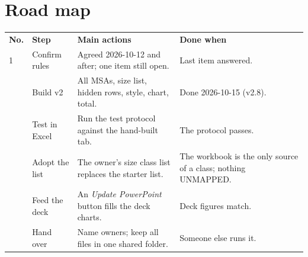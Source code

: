 \documentclass[11pt]{article}
\newcommand{\menu}[1]{\textit{#1}}
\begin{document}
\section{Road map}\label{sec:roadmap}
\begin{center}
\small
{}\label{tab:roadmap}
\renewcommand{\arraystretch}{1.0}
\begin{tabularx}{\linewidth}{|>{\centering\arraybackslash}m{0.25in}|>{\raggedright\arraybackslash}m{0.95in}|L|>{\raggedright\arraybackslash}m{1.45in}|}
  \hline
  \bfseries No. & \bfseries Step & \bfseries Main actions & \bfseries Done when \\
  \hhline{|=|=|=|=|}
  1 & Confirm rules & Agreed 2026-10-12 and after; one item still open. & Last item answered. \\
   & Build v2 & All MSAs, size list, hidden rows, style, chart, total. & Done 2026-10-15 (v2.8). \\
   & Test in Excel & Run the test protocol against the hand-built tab. & The protocol passes. \\
   & Adopt the list & The owner's size class list replaces the starter list. & The workbook is the only source of a class; nothing UNMAPPED. \\
   & Feed the deck & An \menu{Update PowerPoint} button fills the deck charts. & Deck figures match. \\
   & Hand over & Name owners; keep all files in one shared folder. & Someone else runs it. \\
  \hline
\end{tabularx}
\end{center}
\end{document}
